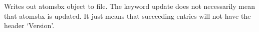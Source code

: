 \documentclass[letterpaper,10pt,english]{sphinxmanual}
\begin{document}
\begin{fulllineitems}
\begin{fulllineitems}
\end{fulllineitems}


\begin{fulllineitems}
\label{classes:bopmodel.atomsbx.write}
Writes out atomsbx object to file.
The keyword update does not necessarily mean that atomsbx
is updated. It just means that succeeding entries will not
have the header `Version'.

\end{fulllineitems}


\end{fulllineitems}

\end{document}
